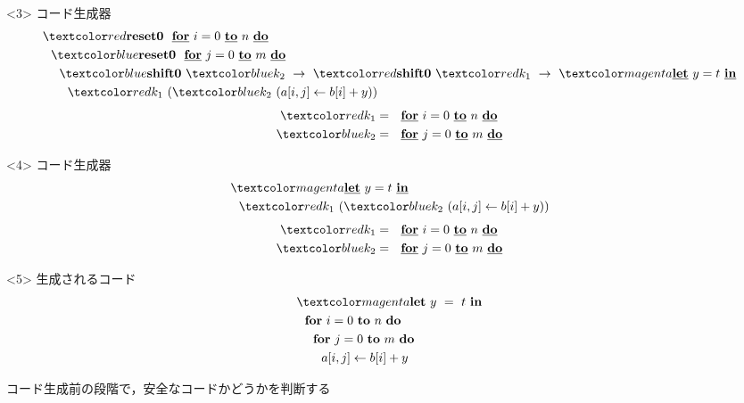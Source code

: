 \begin{frame}
  \begin{onlyenv}<3>
    コード生成器
    \begin{align*}
      & \red{\Resetz} ~~\cfordo{i = 0}{n} \\
      & ~~\blue{\Resetz} ~~\cfordo{j = 0}{m} \\
      & ~~~~\blue{\Shiftz}~\blue{k_2}~\to~ \red{\Shiftz}~\red{k_1}~\to~ \magenta{\cLet~y=t~\cIn} \\
      & ~~~~~~\red{k_1}~(\blue{k_2}~(\aryset{a}{i,j}{b[i] + y}))
    \end{align*}
    \begin{align*}
      \red{k_1} &= ~~\cfordo{i = 0}{n} \\
      \blue{k_2} &= ~~\cfordo{j = 0}{m} \\
    \end{align*}
  \end{onlyenv}

  \begin{onlyenv}<4>
    コード生成器
    \begin{align*}
      & \magenta{\cLet~y=t~\cIn} \\
      & ~~\red{k_1}~(\blue{k_2}~(\aryset{a}{i,j}{b[i] + y}))
    \end{align*}
    \begin{align*}
      \red{k_1} &= ~~\cfordo{i = 0}{n} \\
      \blue{k_2} &= ~~\cfordo{j = 0}{m} \\
    \end{align*}
  \end{onlyenv}

  \begin{onlyenv}<5>
    生成されるコード
    \begin{align*}
      & \magenta{\Let ~y ~= ~t ~\In} \\
      & ~~\fordo{i = 0}{n} \\
      & ~~~~\fordo{j = 0}{m} \\
      & ~~~~~~\aryset{a}{i,j}{b[i] + y} \\
    \end{align*}
  \end{onlyenv}
\end{frame}

\begin{frame}
  \center
  \huge{コード生成前の段階で，安全なコードかどうかを判断する}
\end{frame}


